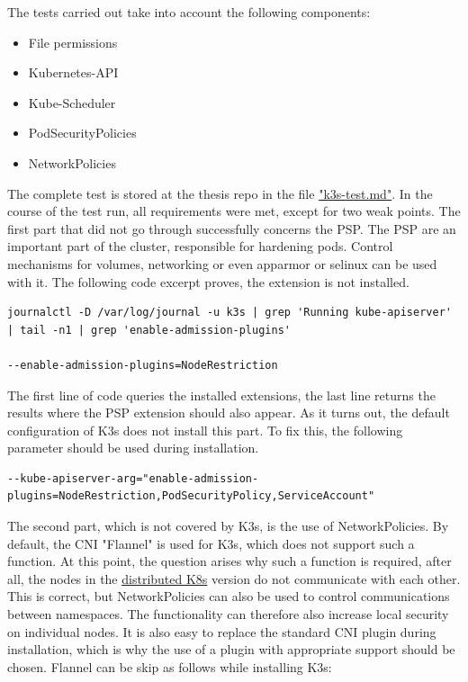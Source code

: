 \documentclass[MSC,Master,english]{twbook}%
\begin{document}
The tests carried out take into account the following components:
\begin{itemize}
    \itemsep0em
    \item File permissions
    \item Kubernetes-API
    \item Kube-Scheduler
    \item PodSecurityPolicies
    \item NetworkPolicies
\end{itemize}
The complete test is stored at the thesis repo\cite{bk-gh-repo} in the file \hyperref{RL: https://github.com/Berndinox/}{}{}{"k3s-test.md"}\cite{bk-gh-k3s-test}. In the course of the test run, all requirements were met, except for two weak points. The first part that did not go through successfully concerns the \ac{PSP}. The \ac{PSP} are an important part of the cluster, responsible for hardening pods. Control mechanisms for volumes, networking or even apparmor or selinux can be used with it. The following code excerpt proves, the extension is not installed.


\begin{lstlisting}[caption={K3s PSP test},captionpos=b]
journalctl -D /var/log/journal -u k3s | grep 'Running kube-apiserver' | tail -n1 | grep 'enable-admission-plugins'

--enable-admission-plugins=NodeRestriction 
\end{lstlisting}

The first line of code queries the installed extensions, the last line returns the results where the \ac{PSP} extension should also appear. As it turns out, the default configuration of K3s does not install this part. To fix this, the following parameter should be used during installation.

\begin{lstlisting}[basicstyle=\tiny,caption={K3s PSP install},captionpos=b]
--kube-apiserver-arg="enable-admission-plugins=NodeRestriction,PodSecurityPolicy,ServiceAccount"
\end{lstlisting}

The second part, which is not covered by K3s, is the use of NetworkPolicies. By default, the \ac{CNI} "Flannel"\cite{flannel} is used for K3s, which does not support such a function. At this point, the question arises why such a function is required, after all, the nodes in the \hyperref[sec:disk8s]{distributed K8s} version do not communicate with each other. This is correct, but NetworkPolicies can also be used to control communications between namespaces. The functionality can therefore also increase local security on individual nodes. It is also easy to replace the standard \ac{CNI} plugin during installation, which is why the use of a plugin with appropriate support should be chosen. Flannel can be skip as follows while installing K3s:
\end{document}

